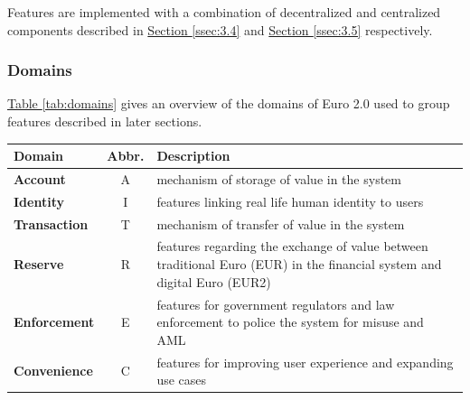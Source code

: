 \documentclass[12pt]{article} %
\newcommand{\hypertableref}[1]{\hyperref[#1]{Table \ref{#1}}}
\newcommand{\hypersectionref}[1]{\hyperref[#1]{Section \ref{#1}}}
\begin{document}
{{Features are implemented with a combination of decentralized and centralized components described in \hypersectionref{ssec:3.4} and \hypersectionref{ssec:3.5} respectively.

\subsubsection{Domains} \label{sssec:3.3:domains}

\hypertableref{tab:domains} gives an overview of the domains of Euro 2.0 used to group features described in later sections.

\begin{center}
\begin{tabular}{ | l | c | p{10cm} | }
 \hline
 Domain & Abbr. & Description \\
 \hline
 \textbf{Account} & A & mechanism of storage of value in the system
 \\ \hline
 \textbf{Identity} & I & features linking real life human identity to users
 \\ \hline
 \textbf{Transaction} & T & mechanism of transfer of value in the system
 \\ \hline
 \textbf{Reserve} & R & features regarding the exchange of value between traditional Euro (EUR) in the financial system and digital Euro (EUR2)
 \\ \hline
 \textbf{Enforcement} & E & features for government regulators and law enforcement to police the system for misuse and AML
 \\ \hline
 \textbf{Convenience} & C & features for improving user experience and expanding use cases
 \\ \hline
\end{tabular}
\end{center}
\label{tab:domains}

%

}}
\end{document}

